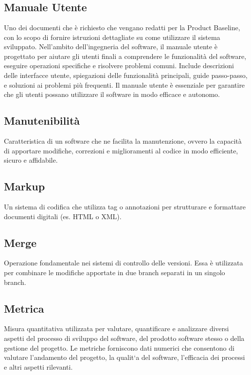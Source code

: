 
\section{}

\hypertarget{sec:manuale_utente}{}
\subsection*{Manuale Utente}
Uno dei documenti che è richiesto che vengano redatti per la Product Baseline, con lo scopo di fornire istruzioni dettagliate su 
come utilizzare il sistema sviluppato. Nell'ambito dell'ingegneria del software, il manuale utente è progettato per aiutare gli 
utenti finali a comprendere le funzionalità del software, eseguire operazioni specifiche e risolvere problemi comuni. Include 
descrizioni delle interfacce utente, spiegazioni delle funzionalità principali, guide passo-passo, e soluzioni ai problemi più 
frequenti. Il manuale utente è essenziale per garantire che gli utenti possano utilizzare il software in modo efficace e autonomo. 

\hypertarget{sec:manutenibilità}{}
\subsection*{Manutenibilità}
Caratteristica di un software che ne facilita la manutenzione, ovvero la capacità di apportare modifiche, correzioni e miglioramenti
al codice in modo efficiente, sicuro e affidabile.

\hypertarget{sec:markup}{}
\subsection*{Markup}
Un sistema di codifica che utilizza tag o annotazioni per strutturare e formattare documenti digitali (es. HTML o XML).

\hypertarget{sec:merge}{}
\subsection*{Merge}
Operazione fondamentale nei sistemi di controllo delle versioni. Essa è utilizzata per combinare le modifiche apportate in due branch separati in un 
singolo branch.

\hypertarget{sec:metrica}{}
\subsection*{Metrica}
Misura quantitativa utilizzata per valutare, quantificare e analizzare diversi aspetti del processo di sviluppo del software, del prodotto software stesso o della gestione del
progetto. Le metriche forniscono dati numerici che consentono di valutare l’andamento del
progetto, la qualit`a del software, l’efficacia dei processi e altri aspetti rilevanti.

